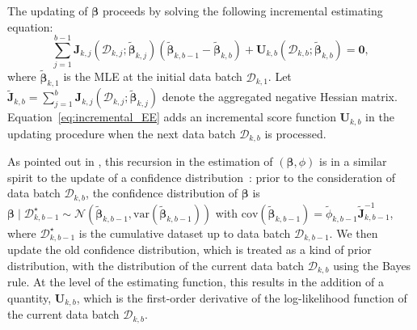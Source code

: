 \documentclass[12pt]{article}
\newcommand{\bJ}{\boldsymbol{J}}
\newcommand{\bU}{\boldsymbol{U}}
\newcommand{\bbeta}{\boldsymbol{\beta}}
\begin{document}
The updating of $\bbeta$ proceeds by solving the following incremental estimating equation:
\begin{equation}\label{eq:incremental_EE}
\sum_{j=1}^{b-1} \bJ_{k,j}(\mathcal{D}_{k,j};\widetilde{\bbeta}_{k,j})
(\widetilde{\bbeta}_{k,b-1} - \widetilde{\bbeta}_{k,b}) + \bU_{k,b}(\mathcal{D}_{k,b};\widetilde{\bbeta}_{k,b}) = \bm{0},
\end{equation}
where $\widetilde{\bbeta}_{k,1}$ is the MLE at the initial data batch $\mathcal{D}_{k,1}$. Let $\widetilde{\bJ}_{k,b} = \sum_{j=1}^b \bJ_{k,j} (\mathcal{D}_{k,j}; \widetilde{\bbeta}_{k,j} )$ denote the aggregated negative Hessian matrix.  Equation~\eqref{eq:incremental_EE} adds an incremental score function $\bU_{k,b}$ in the updating procedure when the next data batch $\mathcal{D}_{k,b}$ is processed. 

As pointed out in \cite{Luo-Song-2020}, this recursion in the estimation of $(\bbeta, \phi)$ is in a similar spirit to the update of a confidence distribution~\cite{Efron1993}: prior to the consideration of data batch $\mathcal{D}_{k,b}$, the confidence distribution of $\bbeta$ is $\bbeta\mid\mathcal{D}^\star_{k,b-1}\sim \mathcal{N} (\widetilde{\bbeta}_{k,b-1},\text{var}(\widetilde{\bbeta}_{k,b-1}) )$ with $\text{cov}(\widetilde{\bbeta}_{k,b-1})=\widetilde{\phi}_{k,b-1}\widetilde{\bJ}_{k,b-1}^{-1}$, where $\mathcal{D}_{k,b-1}^\star$ is the cumulative dataset up to data batch $\mathcal{D}_{k,b-1}$. We then  update the old confidence distribution, which is treated as a kind of prior distribution, with the distribution of the current data batch $\mathcal{D}_{k,b}$ using the Bayes rule. At the level of the estimating function, this results in the addition of a quantity, $\bU_{k,b}$,  which is the first-order derivative of the log-likelihood function of the current data batch $\mathcal{D}_{k,b}$. 
\end{document}
